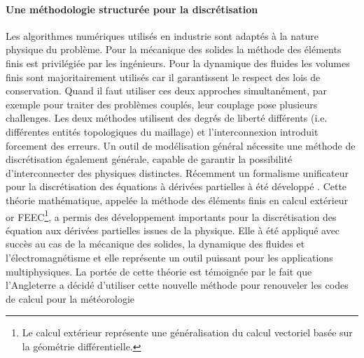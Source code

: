 \documentclass[12pt, french]{article}
\begin{document}
\paragraph{\large Une méthodologie structurée pour la discrétisation \\}
Les algorithmes numériques utilisés en industrie sont adaptés à la nature physique du problème. Pour la mécanique des solides la méthode des éléments finis est privilégiée par les ingénieurs. Pour la dynamique des fluides les volumes finis sont majoritairement utilisés car il garantissent le respect des lois de conservation. Quand il faut utiliser ces deux approches simultanément, par exemple pour traiter des problèmes couplés, leur couplage pose plusieurs challenges. Les deux méthodes utilisent des degrés de liberté différents (i.e. différentes entités topologiques du maillage) et l'interconnexion introduit forcement des erreurs. Un outil de modélisation général nécessite une méthode de discrétisation également générale, capable de  garantir la possibilité d'interconnecter des physiques distinctes. Récemment un formalisme unificateur pour la discrétisation des équations à dérivées partielles  à été développé  \cite{arnold2006acta}. Cette théorie mathématique, appelée la méthode des éléments finis en calcul extérieur or FEEC\footnote{Le calcul extérieur représente une généralisation du calcul vectoriel basée sur la géométrie différentielle.}, a permis des développement importants pour la discrétisation des équation aux dérivées partielles issues de la physique. Elle à été appliqué avec succès au cas de la mécanique des solides, la dynamique des fluides et l'électromagnétisme et elle représente un outil puissant pour les applications multiphysiques. La portée de cette théorie est témoignée par le fait que l'Angleterre a décidé d'utiliser cette nouvelle méthode pour renouveler les codes de calcul pour la météorologie 
\end{document}
